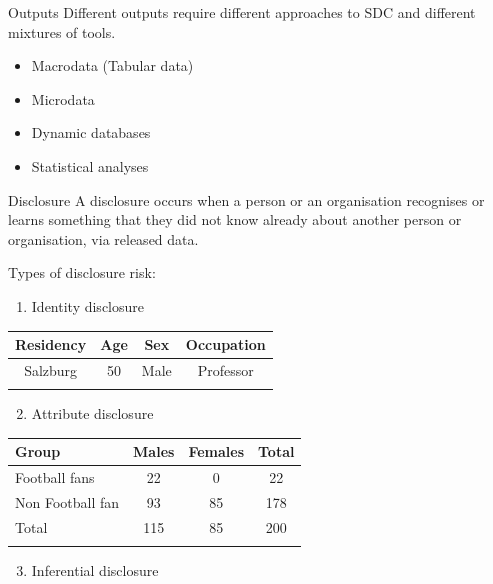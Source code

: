 \documentclass[
  ignorenonframetext,
  aspectratio=169,
]{beamer}
\providecommand{\tightlist}{%
  \setlength{\itemsep}{0pt}\setlength{\parskip}{0pt}}\usepackage{longtable,booktabs,array}
\begin{document}
\begin{frame}{Outputs}
\protect\hypertarget{outputs}{}
Different outputs require different approaches to SDC and different
mixtures of tools.

\begin{itemize}
\item
  Macrodata (Tabular data)
\item
  Microdata
\item
  Dynamic databases
\item
  Statistical analyses
\end{itemize}
\end{frame}

\begin{frame}{Disclosure}
\protect\hypertarget{disclosure}{}
A disclosure occurs when a person or an organisation recognises or
learns something that they did not know already about another person or
organisation, via released data.

Types of disclosure risk:

\begin{enumerate}
[(1)]
\tightlist
\item
  Identity disclosure
\end{enumerate}

\begin{longtable}[]{@{}cccc@{}}
\toprule\noalign{}
Residency & Age & Sex & Occupation \\
\midrule\noalign{}
\endhead
Salzburg & 50 & Male & Professor \\
\bottomrule\noalign{}
\end{longtable}

\begin{enumerate}
[(1)]
\setcounter{enumi}{1}
\tightlist
\item
  Attribute disclosure
\end{enumerate}

\begin{longtable}[]{@{}lccc@{}}
\toprule\noalign{}
Group & Males & Females & Total \\
\midrule\noalign{}
\endhead
Football fans & 22 & 0 & 22 \\
Non Football fan & 93 & 85 & 178 \\
Total & 115 & 85 & 200 \\
\bottomrule\noalign{}
\end{longtable}

\begin{enumerate}
[(1)]
\setcounter{enumi}{2}
\tightlist
\item
  Inferential disclosure
\end{enumerate}
\end{frame}
\end{document}
